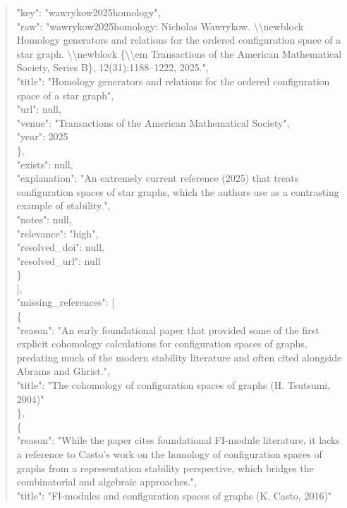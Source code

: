 \documentclass[11pt]{article}
\begin{document}
\begin{quote}
        "key": "wawrykow2025homology",\\
        "raw": "wawrykow2025homology: Nicholas Wawrykow. \textbackslash{}\textbackslash{}newblock Homology generators and relations for the ordered configuration space of a star graph. \textbackslash{}\textbackslash{}newblock \{\textbackslash{}\textbackslash{}em Transactions of the American Mathematical Society, Series B\}, 12(31):1188--1222, 2025.",\\
        "title": "Homology generators and relations for the ordered configuration space of a star graph",\\
        "url": null,\\
        "venue": "Transactions of the American Mathematical Society",\\
        "year": 2025\\
      \},\\
      "exists": null,\\
      "explanation": "An extremely current reference (2025) that treats configuration spaces of star graphs, which the authors use as a contrasting example of stability.",\\
      "notes": null,\\
      "relevance": "high",\\
      "resolved\_doi": null,\\
      "resolved\_url": null\\
    \}\\
  ],\\
  "missing\_references": [\\
    \{\\
      "reason": "An early foundational paper that provided some of the first explicit cohomology calculations for configuration spaces of graphs, predating much of the modern stability literature and often cited alongside Abrams and Ghrist.",\\
      "title": "The cohomology of configuration spaces of graphs (H. Tsutsumi, 2004)"\\
    \},\\
    \{\\
      "reason": "While the paper cites foundational FI-module literature, it lacks a reference to Casto's work on the homology of configuration spaces of graphs from a representation stability perspective, which bridges the combinatorial and algebraic approaches.",\\
      "title": "FI-modules and configuration spaces of graphs (K. Casto, 2016)"\\

\end{quote}
\end{document}
